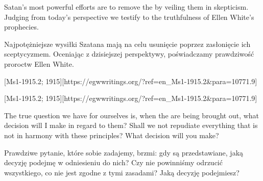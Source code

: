 Satan's most powerful efforts are to remove the  by veiling them in skepticism. Judging from today’s perspective we testify to the truthfulness of Ellen White’s prophecies.


Najpotężniejsze wysiłki Szatana mają na celu usunięcie  poprzez zasłonięcie ich sceptycyzmem. Oceniając z dzisiejszej perspektywy, poświadczamy prawdziwość proroctw Ellen White.


[Ms1-1915.2; 1915][https://egwwritings.org/?ref=en\_Ms1-1915.2&para=10771.9]


[Ms1-1915.2; 1915][https://egwwritings.org/?ref=en\_Ms1-1915.2&para=10771.9]


The true question we have for ourselves is, when the  are being brought out, what decision will I make in regard to them? Shall we not repudiate everything that is not in harmony with these principles? What decision will you make?


Prawdziwe pytanie, które sobie zadajemy, brzmi: gdy  są przedstawiane, jaką decyzję podejmę w odniesieniu do nich? Czy nie powinniśmy odrzucić wszystkiego, co nie jest zgodne z tymi zasadami? Jaką decyzję podejmiesz?




% 